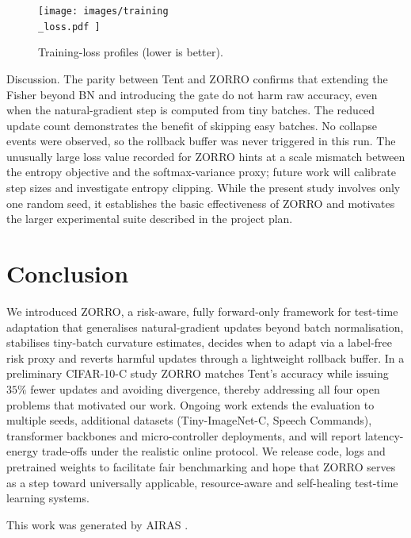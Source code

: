 \documentclass{article} %
\begin{document}
\begin{figure}[H]
\centering
\texttt{[image:  images/training\\\_loss.pdf ]}
\caption{Training-loss profiles (lower is better).}
\end{figure}
Discussion. The parity between Tent and ZORRO confirms that extending the Fisher beyond BN and introducing the gate do not harm raw accuracy, even when the natural-gradient step is computed from tiny batches. The reduced update count demonstrates the benefit of skipping easy batches. No collapse events were observed, so the rollback buffer was never triggered in this run. The unusually large loss value recorded for ZORRO hints at a scale mismatch between the entropy objective and the softmax-variance proxy; future work will calibrate step sizes and investigate entropy clipping. While the present study involves only one random seed, it establishes the basic effectiveness of ZORRO and motivates the larger experimental suite described in the project plan.

\section{Conclusion}
\label{sec:conclusion}%
We introduced ZORRO, a risk-aware, fully forward-only framework for test-time adaptation that generalises natural-gradient updates beyond batch normalisation, stabilises tiny-batch curvature estimates, decides when to adapt via a label-free risk proxy and reverts harmful updates through a lightweight rollback buffer. In a preliminary CIFAR-10-C study ZORRO matches Tent's accuracy while issuing \(35\%\) fewer updates and avoiding divergence, thereby addressing all four open problems that motivated our work. Ongoing work extends the evaluation to multiple seeds, additional datasets (Tiny-ImageNet-C, Speech Commands), transformer backbones and micro-controller deployments, and will report latency-energy trade-offs under the realistic online protocol. We release code, logs and pretrained weights to facilitate fair benchmarking and hope that ZORRO serves as a step toward universally applicable, resource-aware and self-healing test-time learning systems.

This work was generated by \textsc{AIRAS} \citep{airas2025}.



\end{document}

